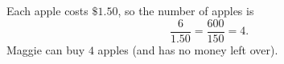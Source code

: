 Each apple costs $\$1.50$, so the number of apples is
\[
\dfrac{6}{1.50}=\dfrac{600}{150}=4 .
\]
Maggie can buy $\boxed{4}$ apples (and has no money left over).
